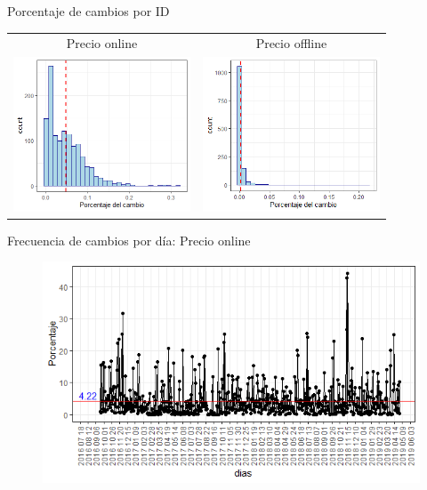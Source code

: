 \documentclass[xcolor=dvipsnames]{beamer}
\begin{document}
\begin{frame}
Porcentaje de cambios por ID
\begin{table}[h]
\begin{tabular}{cc}
Precio online & Precio offline\\
\includegraphics[height=4.59cm]{cambio_producto_internet.png} &
\includegraphics[height=4.59cm]{cambio_producto_normal.png} \\
\end{tabular}
\end{table}
\end{frame}



\begin{frame}
Frecuencia de cambios por d\'ia: Precio online
\begin{figure}
\includegraphics[scale=0.65]{frecuencia_dias_internet.png}
\end{figure}
\end{frame}
\end{document}
